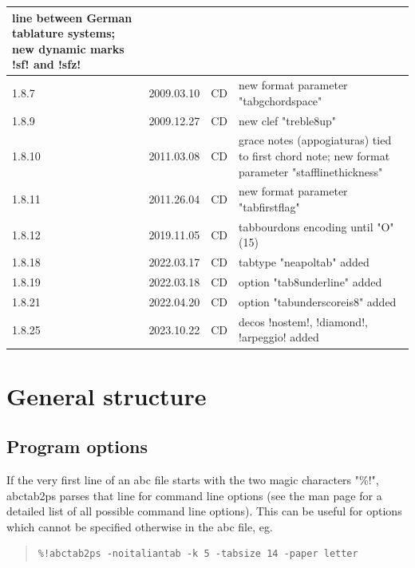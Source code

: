 \documentclass[a4paper]{article}
\begin{document}
\begin{center}
\begin{longtable}{|l|l|l|p{8cm}|}
    line between German tablature systems; new dynamic marks !sf! and !sfz!
    \\ \hline
1.8.7 & 2009.03.10 & CD & new format parameter "tabgchordspace" \\ \hline
1.8.9 & 2009.12.27 & CD & new clef "treble8up" \\ \hline
1.8.10 & 2011.03.08 & CD & grace notes (appogiaturas) tied to first chord note;
    new format parameter "stafflinethickness" \\ \hline
1.8.11 & 2011.26.04 & CD & new format parameter "tabfirstflag"
    \\ \hline
1.8.12 & 2019.11.05 & CD & tabbourdons encoding until "O" (15)
    \\ \hline
1.8.18 & 2022.03.17 & CD & tabtype "neapoltab" added
    \\ \hline
1.8.19 & 2022.03.18 & CD & option "tab8underline" added
    \\ \hline
1.8.21 & 2022.04.20 & CD & option "tabunderscoreis8" added
    \\ \hline
1.8.25 & 2023.10.22 & CD & decos !nostem!, !diamond!, !arpeggio! added
    \\ \hline
\end{longtable}
\end{center}

\section{General structure}

\subsection{Program options}
If the very first line of an abc file starts with the two magic 
characters "\%!", abctab2ps parses that line for command
line options (see the man page for a detailed list of all possible 
command line options). This can be useful for options which cannot
be specified otherwise in the abc file, eg.

\begin{quote}
\begin{verbatim}
%!abctab2ps -noitaliantab -k 5 -tabsize 14 -paper letter
\end{verbatim}
\end{quote}
\end{document}
